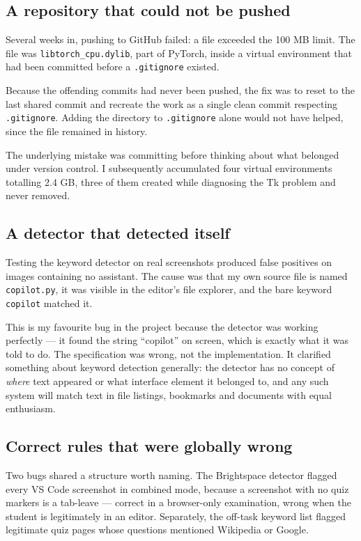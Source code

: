 \documentclass[12pt,oneside]{report}
\newcommand{\code}[1]{\texttt{\small #1}}
\begin{document}
\subsection{A repository that could not be pushed}

Several weeks in, pushing to GitHub failed: a file exceeded the 100 MB limit.
The file was \code{libtorch\_cpu.dylib}, part of PyTorch, inside a virtual
environment that had been committed before a \code{.gitignore} existed.

Because the offending commits had never been pushed, the fix was to reset to
the last shared commit and recreate the work as a single clean commit
respecting \code{.gitignore}. Adding the directory to \code{.gitignore} alone
would not have helped, since the file remained in history.

The underlying mistake was committing before thinking about what belonged under
version control. I subsequently accumulated four virtual environments totalling
2.4 GB, three of them created while diagnosing the Tk problem and never
removed.

\subsection{A detector that detected itself}

Testing the keyword detector on real screenshots produced false positives on
images containing no assistant. The cause was that my own source file is named
\code{copilot.py}, it was visible in the editor's file explorer, and the bare
keyword \code{copilot} matched it.

This is my favourite bug in the project because the detector was working
perfectly --- it found the string ``copilot'' on screen, which is exactly what
it was told to do. The specification was wrong, not the implementation. It
clarified something about keyword detection generally: the detector has no
concept of \emph{where} text appeared or what interface element it belonged to,
and any such system will match text in file listings, bookmarks and documents
with equal enthusiasm.

\subsection{Correct rules that were globally wrong}

Two bugs shared a structure worth naming. The Brightspace detector flagged
every VS Code screenshot in combined mode, because a screenshot with no quiz
markers is a tab-leave --- correct in a browser-only examination, wrong when
the student is legitimately in an editor. Separately, the off-task keyword list
flagged legitimate quiz pages whose questions mentioned Wikipedia or Google.
\end{document}
